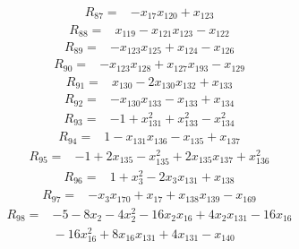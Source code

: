 {%
\begin{align*}
R_{87} ={}& -x_{17} x_{120} + x_{123}
\end{align*}
\begin{align*}
R_{88} ={}& x_{119} - x_{121} x_{123} - x_{122}
\end{align*}
\begin{align*}
R_{89} ={}& -x_{123} x_{125} + x_{124} - x_{126}
\end{align*}
\begin{align*}
R_{90} ={}& -x_{123} x_{128} + x_{127} x_{193} - x_{129}
\end{align*}
\begin{align*}
R_{91} ={}& x_{130} - 2x_{130} x_{132} + x_{133}
\end{align*}
\begin{align*}
R_{92} ={}& -x_{130} x_{133} - x_{133} + x_{134}
\end{align*}
\begin{align*}
R_{93} ={}& -1 + x_{131}^{2} + x_{133}^{2} - x_{134}^{2}
\end{align*}
\begin{align*}
R_{94} ={}& 1 - x_{131} x_{136} - x_{135} + x_{137}
\end{align*}
\begin{align*}
R_{95} ={}& -1 + 2x_{135} - x_{135}^{2} + 2x_{135} x_{137} + x_{136}^{2}
\end{align*}
\begin{align*}
R_{96} ={}& 1 + x_{3}^{2} - 2x_{3} x_{131} + x_{138}
\end{align*}
\begin{align*}
R_{97} ={}& -x_{3} x_{170} + x_{17} + x_{138} x_{139} - x_{169}
\end{align*}
\begin{align*}
R_{98} ={}& -5 - 8x_{2} - 4x_{2}^{2} - 16x_{2} x_{16} + 4x_{2} x_{131} - 16x_{16} \\
&{}  - 16x_{16}^{2} + 8x_{16} x_{131} + 4x_{131} - x_{140}
\end{align*}
\begin{align*}

\end{align*}}
